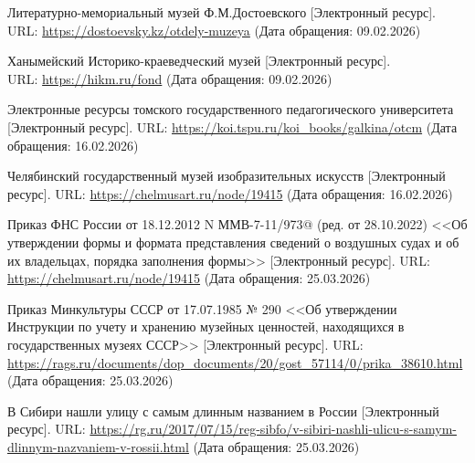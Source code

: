  \par

\renewcommand{\refname}{Список использованных источников}
\begin{thebibliography}{}

     Литературно-мемориальный музей Ф.М.Достоевского [Электронный ресурс]. URL: \href{https://dostoevsky.kz/otdely-muzeya}{https://dostoevsky.kz/otdely-muzeya} (Дата обращения: 09.02.2026)
    
     Ханымейский Историко-краеведческий музей [Электронный ресурс]. \\ URL: \href{https://hikm.ru/fond.html}{https://hikm.ru/fond} (Дата обращения: 09.02.2026)

     Электронные ресурсы томского государственного педагогического университета [Электронный ресурс]. URL: \href{https://koi.tspu.ru/koi_books/galkina/otcm.htm}{https://koi.tspu.ru/koi\_books/galkina/otcm} (Дата обращения: 16.02.2026)

     Челябинский государственный музей изобразительных искусств [Электронный ресурс]. URL: \href{https://chelmusart.ru/node/19415}{https://chelmusart.ru/node/19415} (Дата обращения: 16.02.2026)

     Приказ ФНС России от 18.12.2012 N ММВ-7-11/973@ (ред. от 28.10.2022) <<Об утверждении формы и формата представления сведений о воздушных судах и об их владельцах, порядка заполнения формы>> [Электронный ресурс]. URL: \href{https://chelmusart.ru/node/19415}{https://chelmusart.ru/node/19415} (Дата обращения: 25.03.2026)

     Приказ Минкультуры СССР от 17.07.1985 № 290 <<Об утверждении Инструкции по учету и хранению музейных ценностей, находящихся в государственных музеях СССР>> [Электронный ресурс]. URL: \href{https://rags.ru/documents/dop_documents/20/gost_57114/0/prika_38610.html}{https://rags.ru/documents/dop\_documents/20/gost\_57114/0/prika\_38610.html} (Дата обращения: 25.03.2026)

     В Сибири нашли улицу с самым длинным названием в России
     [Электронный ресурс]. URL: \href{https://rg.ru/2017/07/15/reg-sibfo/v-sibiri-nashli-ulicu-s-samym-dlinnym-nazvaniem-v-rossii.html}{https://rg.ru/2017/07/15/reg-sibfo/v-sibiri-nashli-ulicu-s-samym-dlinnym-nazvaniem-v-rossii.html} (Дата обращения: 25.03.2026)


\end{thebibliography}
